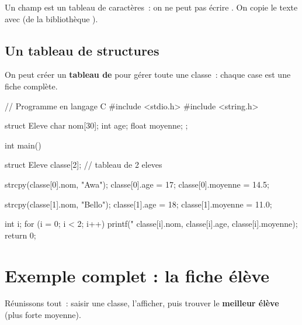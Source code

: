 \begin{remarque}
Un champ  est un tableau de caractères~: on ne peut pas écrire
. On copie le texte avec  (de la bibliothèque
).
\end{remarque}

\subsection{Un tableau de structures}

On peut créer un \textbf{tableau de } pour gérer toute une classe~:
chaque case est une fiche complète.

\begin{codec}
// Programme en langage C
#include <stdio.h>
#include <string.h>

struct Eleve {
    char nom[30];
    int age;
    float moyenne;
};

int main() {
    struct Eleve classe[2];     // tableau de 2 eleves

    strcpy(classe[0].nom, "Awa");
    classe[0].age = 17;
    classe[0].moyenne = 14.5;

    strcpy(classe[1].nom, "Bello");
    classe[1].age = 18;
    classe[1].moyenne = 11.0;

    int i;
    for (i = 0; i < 2; i++) {
        printf("%
               classe[i].nom, classe[i].age, classe[i].moyenne);
    }
    return 0;
}
\end{codec}


\section{Exemple complet : la fiche élève}

Réunissons tout~: saisir une classe, l'afficher, puis trouver le \textbf{meilleur
élève} (plus forte moyenne).

